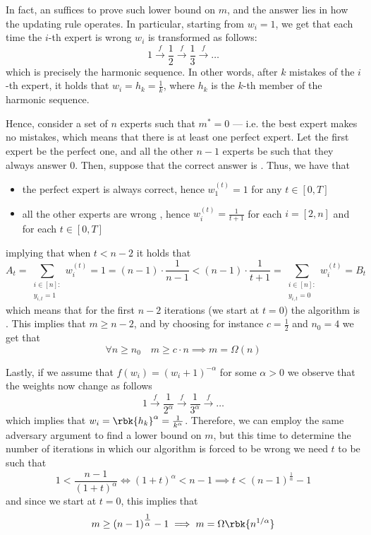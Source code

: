 \documentclass[a4paper, 12pt]{report}
\begin{document}
{        In fact, an  suffices to prove such lower bound on $m$, and the answer lies in how the updating rule operates. In particular, starting from $w_i = 1$, we get that each time the $i$-th expert is wrong $w_i$ is transformed as follows: $$1 \stackrel{f}{\longrightarrow} \dfrac{1}{2} \stackrel{f}{\longrightarrow} \dfrac{1}{3} \stackrel{f}{\longrightarrow} \ldots$$ which is precisely the harmonic sequence. In other words, after $k$ mistakes of the $i$-th expert, it holds that $w_i = h_k = \tfrac{1}{k}$, where $h_k$ is the $k$-th member of the harmonic sequence.

        Hence, consider a set of $n$ experts such that $m^* = 0$ --- i.e. the best expert makes no mistakes, which means that there is at least one perfect expert. Let the first expert be the perfect one, and all the other $n - 1$ experts be such that they always answer 0. Then, suppose that the correct answer is . Thus, we have that

        \begin{itemize}
            \item the perfect expert is always correct, hence $w_1^{(t)} = 1$ for any $t \in [0, T]$
            \item all the other experts are wrong , hence $w_i^{(t)} = \tfrac{1}{t + 1}$ for each $i = [2, n]$ and for each $t \in [0, T]$
        \end{itemize}

        implying that when $t < n - 2$ it holds that $$A_t = \sum_{\substack{i \in [n] : \\ y_{i, t} = 1}}{w_i^{(t)}} = 1 = (n - 1) \cdot \dfrac{1}{n - 1} < (n - 1) \cdot \dfrac{1}{t + 1} = \sum_{\substack{i \in [n] : \\ y_{i, t} = 0}}{w_i^{(t)}} = B_t$$ which means that for the first $n - 2$ iterations (we start at $t = 0$) the algorithm is . This implies that $m \ge n - 2$, and by choosing for instance $c = \tfrac{1}{2}$ and $n_0 = 4$ we get that $$\forall n \ge n_0 \quad m \ge c \cdot n \implies m = \Omega(n)$$

        Lastly, if we assume that $f(w_i) = (w_i + 1)^{-\alpha}$ for some $\alpha > 0$ we observe that the weights now change as follows $$1 \stackrel{f}{\longrightarrow} \dfrac{1}{2^\alpha} \stackrel{f}{\longrightarrow} \dfrac{1}{3^\alpha} \stackrel{f}{\longrightarrow} \ldots$$ which implies that $w_i = \rbk{h_k}^\alpha = \tfrac{1}{k^\alpha}$. Therefore, we can employ the same adversary argument to find a lower bound on $m$, but this time to determine the number of iterations in which our algorithm is forced to be wrong we need $t$ to be such that $$1 < \dfrac{n - 1}{(1 + t)^\alpha} \iff (1 + t)^\alpha < n - 1 \implies t < (n - 1)^{\tfrac{1}{\alpha}} - 1$$ and since we start at $t = 0$, this implies that $$m \ge (n - 1)^{\tfrac{1}{\alpha}} - 1 \implies m = \Omega \rbk{n^{1/\alpha}}$$
    }

    \printbibliography %
\end{document}
